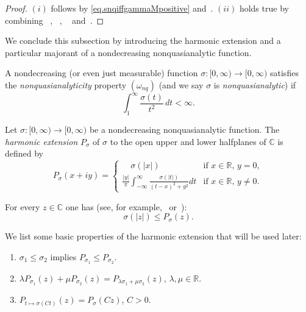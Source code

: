 \documentclass[11pt,a4paper]{article}
\theoremstyle{plain}
\theoremstyle{definition}
\newcommand{\RR}{\mathbb{R}}
\newcommand{\R}{\mathbb{R}}
\newcommand{\C}{\mathbb{C}}
\begin{document}
\begin{proof} $(i)$ follows by \eqref{eq.snqiffgammaMpositive} and~\cite[Coro.\ 4.2.(ii)]{JimenezSanzSchindlIndex}. $(ii)$  holds true by combining ~\cite[Lemma \ 2.10]{JimenezSanzSchindlIndex}, ~\cite[Coro.\ 2.13]{JimenezSanzSchindlIndex}, ~\cite[Thm. 3.10]{JimenezSanzSchindlIndex} and~\cite[Prop.\ 4.1]{JimenezSanzSchindlIndex}.
\end{proof}

We conclude this subsection by introducing the harmonic extension and a particular majorant of a nondecreasing nonquasianalytic function.

A nondecreasing (or even just measurable) function $\sigma:[0,\infty)\to [0,\infty)$ satisfies the \emph{nonquasianalyticity} property $(\omega_{nq})$ (and we say $\sigma$ is \emph{nonquasianalytic}) if
	$$\int_{1}^{\infty}\frac{\sigma(t)}{t^2}\,dt<\infty.$$

Let $\sigma:[0,\infty)\to [0,\infty)$ be a nondecreasing nonquasianalytic function. The \emph{harmonic extension} $P_\sigma$ of $\sigma$ to the open upper and lower halfplanes of $\C$ is defined by
	\begin{equation}\label{harmonicextension}
		P_\sigma(x+iy)=\begin{cases}
			\quad\sigma(|x|)&\text{if } x\in\R,\,y=0,\\
\displaystyle\frac{|y|}{\pi}\int_{-\infty}^{\infty}\frac{\sigma(|t|)}{(t-x)^2+y^2}dt& \text{if }x\in\R,\,y\neq0.
		\end{cases}
	\end{equation}

For every $z\in\C$ one has (see, for example,~\cite[Remark 3.2]{BonetMeiseTaylor92} or~\cite[Prop.\ 5.5]{NenningRainerSchindl_preprint}):
	\begin{equation}\label{omegapbound}
		\sigma(|z|)\leq P_{\sigma}(z).
	\end{equation}

We list some basic properties of the harmonic extension that will be used later:
\begin{enumerate}
	\item[(1)] $\sigma_1 \leq \sigma_2$ implies $P_{\sigma_1}\leq P_{\sigma_2}$.
	\item[(2)] $\lambda P_{\sigma_1}(z)+\mu P_{\sigma_2}(z)=P_{\lambda\sigma_1+\mu\sigma_2}(z)$, $\lambda,\mu \in\RR$.
	\item[(3)] $P_{t\mapsto\sigma(Ct)}(z)=P_{\sigma}(Cz)$, $C>0$.
\end{enumerate}
\end{document}
